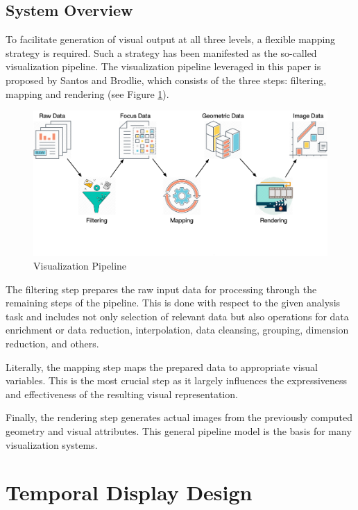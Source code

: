 \documentclass[12pt]{iopart}
\begin{document}
\subsection{System Overview}

To facilitate generation of visual output at all three levels, a flexible mapping strategy is required. Such a strategy has been manifested as the so-called visualization pipeline. The visualization pipeline leveraged in this paper is proposed by Santos and Brodlie\cite{dosSantos:2004ck}, which consists of the three steps: filtering, mapping and rendering (see Figure \ref{fig:pipeline}).

\begin{figure}
    \centering
    \includegraphics[width=.95\textwidth]{images/pipeline.png}
    \caption{Visualization Pipeline}
    \label{fig:pipeline}
\end{figure}

The filtering step prepares the raw input data for processing through the remaining steps of the pipeline. This is done with respect to the given analysis task and includes not only selection of relevant data but also operations for data enrichment or data reduction, interpolation, data cleansing, grouping, dimension reduction, and others. 

Literally, the mapping step maps the prepared data to appropriate visual variables. This is the most crucial step as it largely influences the expressiveness and effectiveness of the resulting visual representation. 

Finally, the rendering step generates actual images from the previously computed geometry and visual attributes. This general pipeline model is the basis for many visualization systems.

\section{Temporal Display Design}
\label{sec:tdd}
\end{document}
